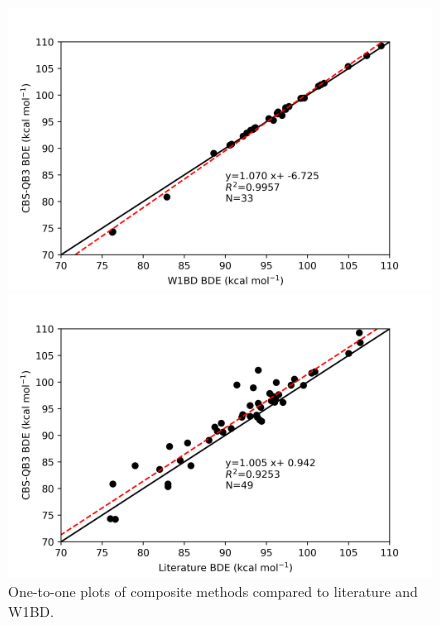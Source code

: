 \begin{doublespace}
\begin{figure}[H]
\hspace*{-1.2cm}
\begin{minipage}{8cm}
  \centering
  \includegraphics[width=\textwidth]{figures/w1bd-cbsqb3}
\end{minipage}%
\begin{minipage}{8cm}
  \centering
  \includegraphics[width=\textwidth]{figures/lit-cbsqb3}
\end{minipage}
\caption{One-to-one plots of composite methods compared to literature and W1BD.}
\end{figure}


\end{doublespace}
